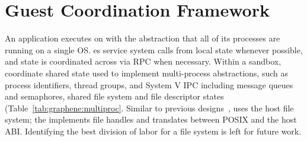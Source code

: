 \section{Guest Coordination Framework}
\label{sec:graphene:namespaces}



An application executes on \sysname{} 
with the abstraction that all of its processes are running on a single OS.
\sysname{} \libos{}es service system calls
from local \libos{} state whenever possible,
and state is coordinated across \picoprocs{} via RPC when necessary.
Within a sandbox, \sysname{} \picoprocs{} 
coordinate shared state used to implement multi-process
abstractions, such as process identifiers, thread groups, and 
System V IPC including message queues and semaphores, shared file system and file descriptor states (Table~\ref{tab:graphene:multiproc}.
Similar to previous designs~\citep{porter11drawbridge,baumann13bascule}, 
\sysname{} uses the host file system; 
the \libos{} implements file handles and translates between POSIX and the host ABI.
Identifying the best division of labor for a \libos{} file system is 
left for future work.

